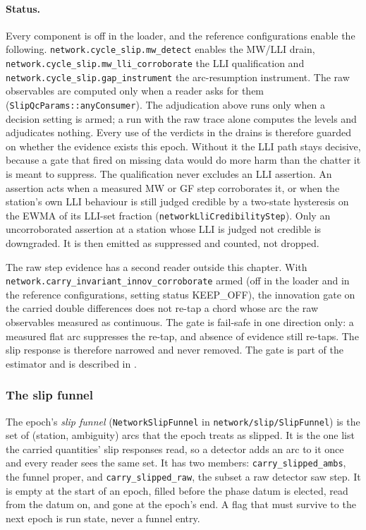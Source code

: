 \documentclass[main.tex]{subfiles}
\begin{document}
\paragraph{Status.}
Every component is off in the loader, and the reference configurations enable the
following.  \texttt{network.cycle\_slip.mw\_detect} enables the MW/LLI drain,
\texttt{network.cycle\_slip.mw\_lli\_corroborate} the LLI qualification
and \texttt{network.cycle\_slip.gap\_instrument} the arc-resumption
instrument.  The raw observables are computed only when a reader asks
for them (\texttt{SlipQcParams::anyConsumer}).  The adjudication above
runs only when a decision setting is armed; a run with the raw trace alone
computes the levels and adjudicates nothing.  Every use of the verdicts
in the drains is therefore guarded on whether the evidence exists this
epoch.  Without it the LLI path stays decisive, because a gate that fired
on missing data would do more harm than the chatter it is meant to
suppress.  The qualification never excludes an LLI assertion.  An
assertion acts when a measured MW or GF step corroborates it, or when
the station's own LLI behaviour is still judged credible by a two-state
hysteresis on the EWMA of its LLI-set fraction
(\texttt{networkLliCredibilityStep}).  Only an uncorroborated assertion
at a station whose LLI is judged not credible is downgraded.  It is then
emitted as suppressed and counted, not dropped.

The raw step evidence has a second reader outside this chapter.  With
\texttt{network.carry\_invariant\_innov\_corroborate} armed (off in the
loader and in the reference configurations, setting status KEEP\_OFF), the
innovation gate on the carried double differences does not re-tap a chord
whose arc the raw observables measured as continuous.  The gate is
fail-safe in one direction only: a measured flat arc suppresses the
re-tap, and absence of evidence still re-taps.  The slip response is
therefore narrowed and never removed.  The gate is part of the estimator
and is described in .

\subsubsection{The slip funnel}\label{sec:slip-funnel}

The epoch's \emph{slip funnel} (\texttt{NetworkSlipFunnel} in
\texttt{network/slip/SlipFunnel}) is the set of (station, ambiguity)
arcs that the epoch treats as slipped.  It is the one list the carried
quantities' slip responses read, so a detector adds an arc to it once and
every reader sees the same set.  It has two members:
\texttt{carry\_slipped\_ambs}, the funnel proper, and
\texttt{carry\_slipped\_raw}, the subset a raw detector saw step.  It is
empty at the start of an epoch, filled before the phase datum is elected,
read from the datum on, and gone at the epoch's end.  A flag that must
survive to the next epoch is run state, never a funnel entry.
\end{document}
